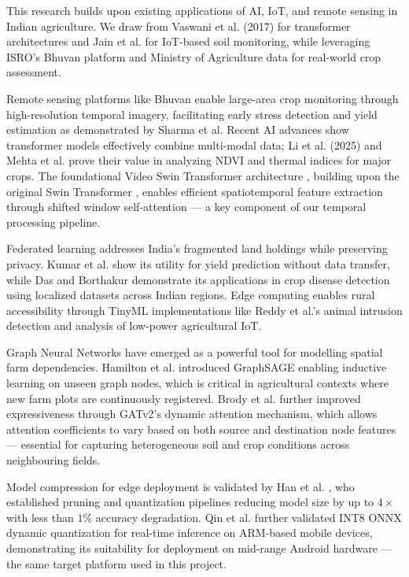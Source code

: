 This research builds upon existing applications of AI, IoT, and remote sensing in Indian agriculture. We draw from Vaswani et al. (2017) for transformer architectures and Jain et al. \cite{jain2022iot} for IoT-based soil monitoring, while leveraging ISRO's Bhuvan platform and Ministry of Agriculture data \cite{agriculture2023ministry} for real-world crop assessment.

Remote sensing platforms like Bhuvan enable large-area crop monitoring through high-resolution temporal imagery, facilitating early stress detection and yield estimation as demonstrated by Sharma et al. Recent AI advances show transformer models effectively combine multi-modal data; Li et al. (2025) and Mehta et al. \cite{mehta2024multimodal} prove their value in analyzing NDVI and thermal indices for major crops. The foundational Video Swin Transformer architecture \cite{liu2022swin3d}, building upon the original Swin Transformer \cite{liu2021swin}, enables efficient spatiotemporal feature extraction through shifted window self-attention — a key component of our temporal processing pipeline.

Federated learning addresses India's fragmented land holdings while preserving privacy. Kumar et al. \cite{kumar2023federated} show its utility for yield prediction without data transfer, while Das and Borthakur \cite{das2023federated} demonstrate its applications in crop disease detection using localized datasets across Indian regions. Edge computing enables rural accessibility through TinyML implementations like Reddy et al.'s \cite{reddy2023tinyml} animal intrusion detection and analysis of low-power agricultural IoT.

Graph Neural Networks have emerged as a powerful tool for modelling spatial farm dependencies. Hamilton et al. \cite{hamilton2017graphsage} introduced GraphSAGE enabling inductive learning on unseen graph nodes, which is critical in agricultural contexts where new farm plots are continuously registered. Brody et al. \cite{brody2022gatv2} further improved expressiveness through GATv2's dynamic attention mechanism, which allows attention coefficients to vary based on both source and destination node features — essential for capturing heterogeneous soil and crop conditions across neighbouring fields.

Model compression for edge deployment is validated by Han et al. \cite{han2016deep}, who established pruning and quantization pipelines reducing model size by up to $4\times$ with less than $1\%$ accuracy degradation. Qin et al. \cite{qin2023onnxquant} further validated INT8 ONNX dynamic quantization for real-time inference on ARM-based mobile devices, demonstrating its suitability for deployment on mid-range Android hardware — the same target platform used in this project.

